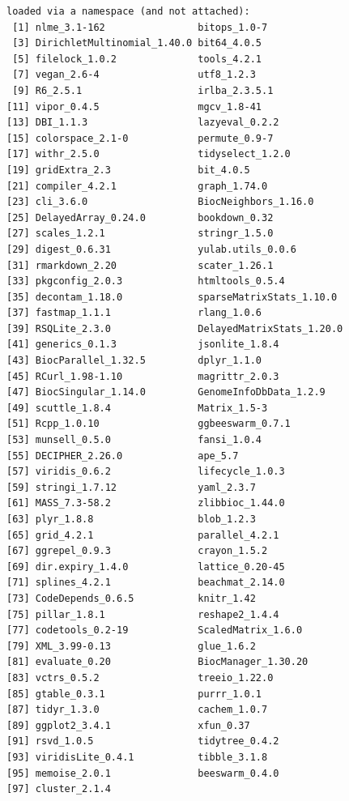 \documentclass[
]{book}
\begin{document}
\begin{verbatim}
loaded via a namespace (and not attached):
 [1] nlme_3.1-162                bitops_1.0-7               
 [3] DirichletMultinomial_1.40.0 bit64_4.0.5                
 [5] filelock_1.0.2              tools_4.2.1                
 [7] vegan_2.6-4                 utf8_1.2.3                 
 [9] R6_2.5.1                    irlba_2.3.5.1              
[11] vipor_0.4.5                 mgcv_1.8-41                
[13] DBI_1.1.3                   lazyeval_0.2.2             
[15] colorspace_2.1-0            permute_0.9-7              
[17] withr_2.5.0                 tidyselect_1.2.0           
[19] gridExtra_2.3               bit_4.0.5                  
[21] compiler_4.2.1              graph_1.74.0               
[23] cli_3.6.0                   BiocNeighbors_1.16.0       
[25] DelayedArray_0.24.0         bookdown_0.32              
[27] scales_1.2.1                stringr_1.5.0              
[29] digest_0.6.31               yulab.utils_0.0.6          
[31] rmarkdown_2.20              scater_1.26.1              
[33] pkgconfig_2.0.3             htmltools_0.5.4            
[35] decontam_1.18.0             sparseMatrixStats_1.10.0   
[37] fastmap_1.1.1               rlang_1.0.6                
[39] RSQLite_2.3.0               DelayedMatrixStats_1.20.0  
[41] generics_0.1.3              jsonlite_1.8.4             
[43] BiocParallel_1.32.5         dplyr_1.1.0                
[45] RCurl_1.98-1.10             magrittr_2.0.3             
[47] BiocSingular_1.14.0         GenomeInfoDbData_1.2.9     
[49] scuttle_1.8.4               Matrix_1.5-3               
[51] Rcpp_1.0.10                 ggbeeswarm_0.7.1           
[53] munsell_0.5.0               fansi_1.0.4                
[55] DECIPHER_2.26.0             ape_5.7                    
[57] viridis_0.6.2               lifecycle_1.0.3            
[59] stringi_1.7.12              yaml_2.3.7                 
[61] MASS_7.3-58.2               zlibbioc_1.44.0            
[63] plyr_1.8.8                  blob_1.2.3                 
[65] grid_4.2.1                  parallel_4.2.1             
[67] ggrepel_0.9.3               crayon_1.5.2               
[69] dir.expiry_1.4.0            lattice_0.20-45            
[71] splines_4.2.1               beachmat_2.14.0            
[73] CodeDepends_0.6.5           knitr_1.42                 
[75] pillar_1.8.1                reshape2_1.4.4             
[77] codetools_0.2-19            ScaledMatrix_1.6.0         
[79] XML_3.99-0.13               glue_1.6.2                 
[81] evaluate_0.20               BiocManager_1.30.20        
[83] vctrs_0.5.2                 treeio_1.22.0              
[85] gtable_0.3.1                purrr_1.0.1                
[87] tidyr_1.3.0                 cachem_1.0.7               
[89] ggplot2_3.4.1               xfun_0.37                  
[91] rsvd_1.0.5                  tidytree_0.4.2             
[93] viridisLite_0.4.1           tibble_3.1.8               
[95] memoise_2.0.1               beeswarm_0.4.0             
[97] cluster_2.1.4              
\end{verbatim}
\end{document}
